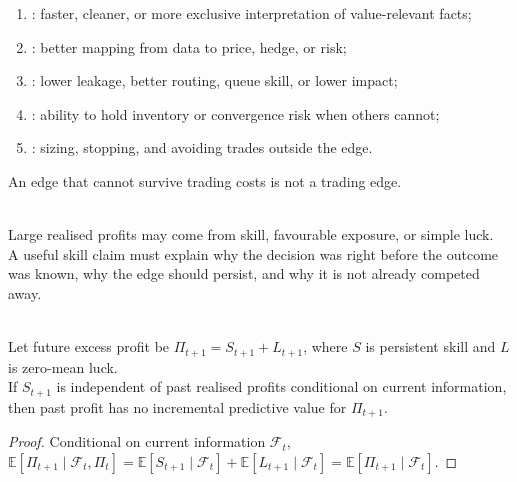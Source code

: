 \documentclass[a4paper,oneside,openany]{book}
\begin{document}
\begin{taxonomy} 
\begin{enumerate}[label=\roman*.]
\setlength{\itemsep}{0pt}
\item {}: faster, cleaner, or more exclusive interpretation of value-relevant facts;
\item {}: better mapping from data to price, hedge, or risk;
\item {}: lower leakage, better routing, queue skill, or lower impact;
\item {}: ability to hold inventory or convergence risk when others cannot;
\item {}: sizing, stopping, and avoiding trades outside the edge.
\end{enumerate}
An edge that cannot survive trading costs is not a trading edge.
\end{taxonomy}

\begin{caveat} \\
Large realised profits may come from skill, favourable exposure, or simple luck.\\
A useful skill claim must explain why the decision was right before the outcome was known, why the edge should persist, and why it is not already competed away.
\end{caveat}

\begin{proposition} \\
Let future excess profit be $\Pi_{t+1}=S_{t+1}+L_{t+1}$, where $S$ is persistent skill and $L$ is zero-mean luck.\\
If $S_{t+1}$ is independent of past realised profits conditional on current information, then past profit has no incremental predictive value for $\Pi_{t+1}$.
\begin{proof}
Conditional on current information $\mathcal{F}_t$, $\mathbb{E}[\Pi_{t+1}\mid \mathcal{F}_t,\Pi_t]=\mathbb{E}[S_{t+1}\mid \mathcal{F}_t]+\mathbb{E}[L_{t+1}\mid \mathcal{F}_t]=\mathbb{E}[\Pi_{t+1}\mid \mathcal{F}_t]$.
\end{proof}
\end{proposition}
\end{document}
